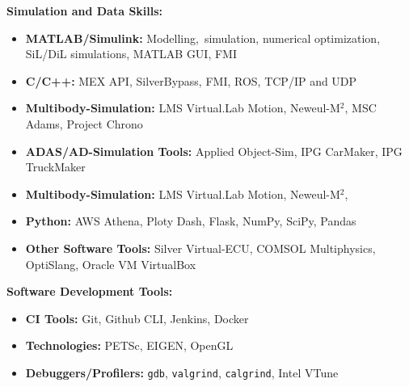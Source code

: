 \documentclass{mycv}
\begin{document}
\begin{paracol}{2}
     {\bfseries Simulation and Data Skills:}
     \begin{itemize}
         \item {\bfseries MATLAB/Simulink:} Modelling, \,simulation,
             numerical optimization, SiL/DiL simulations, MATLAB GUI, FMI
         \item {\bfseries C/C++:} MEX API, SilverBypass, FMI, ROS, TCP/IP and UDP
         \item{\bfseries Multibody-Simulation:}  LMS Virtual.Lab Motion, Neweul-M$^2$, 
             MSC Adams, Project Chrono
         \item{\bfseries ADAS/AD-Simulation Tools:}  Applied Object-Sim, IPG CarMaker, IPG TruckMaker
         \item{\bfseries Multibody-Simulation:}  LMS Virtual.Lab Motion, Neweul-M$^2$, 
         \item {\bfseries Python:} AWS Athena, Ploty Dash, Flask, NumPy, SciPy, Pandas
         \item {\bfseries Other Software Tools:}  Silver Virtual-ECU, COMSOL
             Multiphysics, OptiSlang, Oracle VM VirtualBox
     \end{itemize}\par

     {\bfseries Software Development Tools:}\par
     \begin{itemize}
         \item {\bfseries CI Tools:} Git, Github CLI, Jenkins, Docker\par
         \item {\bfseries Technologies:} PETSc, EIGEN, OpenGL\par
         \item {\bfseries Debuggers/Profilers:} \verb|gdb|, \verb|valgrind|, \verb|calgrind|,
             Intel VTune\\
     \end{itemize}
        


\end{paracol}
\end{document}

